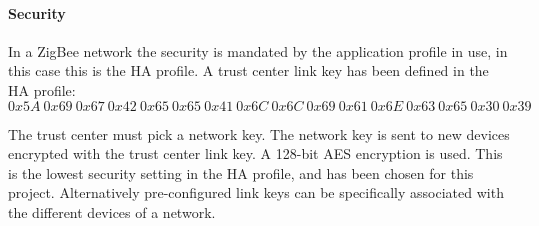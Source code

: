 \documentclass[Main]{subfiles}
\begin{document}



			\paragraph{Security} %
				In a ZigBee network the security is mandated by the application profile in use, in this case this is the HA profile.
				A trust center link key has been defined in the HA profile\cite{HASpec}:
				\begin{equation}
					0x5A\ 0x69\ 0x67\ 0x42\ 0x65\ 0x65\ 0x41\ 0x6C\ 0x6C\ 0x69\ 0x61\ 0x6E\ 0x63\ 0x65\ 0x30\ 0x39	
				\end{equation}
				
				The trust center must pick a network key. The network key is sent to new devices encrypted with the trust center link key.
				A 128-bit AES encryption is used.
				This is the lowest security setting in the HA profile, and has been chosen for this project. 
				Alternatively pre-configured link keys can be specifically associated with the different devices of a network.
			\label{par:security}
			

			





\end{document}
